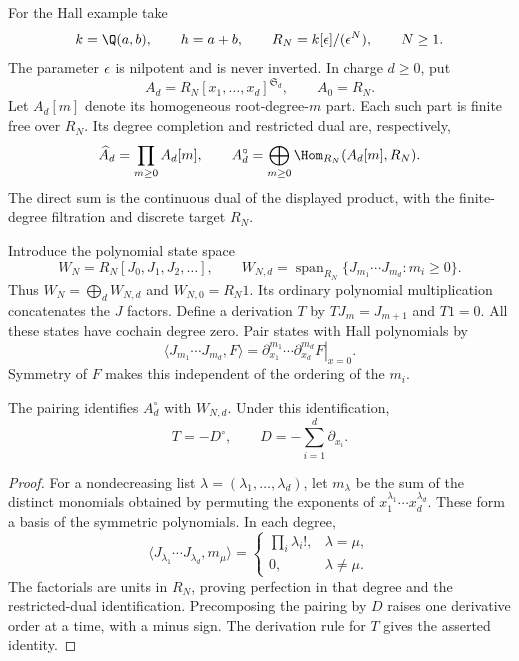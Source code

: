 For the Hall example take
\[
 k=\Q(a,b),\qquad h=a+b,\qquad
 R_N=k[\eps]/(\eps^N),\qquad N\geq1.
\]
The parameter $\epsilon$ is nilpotent and is never inverted. In charge
$d\geq0$, put
\[
 A_d=R_N[x_1,\ldots,x_d]^{\mathfrak S_d},\qquad A_0=R_N.
\]
Let $A_d[m]$ denote its homogeneous root-degree-$m$ part. Each such
part is finite free over $R_N$. Its degree completion and restricted
dual are, respectively,
\begin{equation}\label{cyjets:eq:restricted-dual}
 \widehat A_d=\prod_{m\geq0}A_d[m],\qquad
 A_d^\circ=\bigoplus_{m\geq0}
                 \Hom_{R_N}(A_d[m],R_N).
\end{equation}
The direct sum is the continuous dual of the displayed product,
with the finite-degree filtration and discrete target $R_N$.

Introduce the polynomial state space
\[
 W_N=R_N[J_0,J_1,J_2,\ldots],\qquad
 W_{N,d}=\operatorname{span}_{R_N}
       \{J_{m_1}\cdots J_{m_d}:m_i\geq0\}.
\]
Thus $W_N=\bigoplus_dW_{N,d}$ and $W_{N,0}=R_N1$.
Its ordinary polynomial multiplication concatenates the $J$ factors.
Define a derivation $T$ by $TJ_m=J_{m+1}$ and $T1=0$.
All these states have cochain degree zero. Pair states with Hall
polynomials by
\begin{equation}\label{cyjets:eq:pairing}
 \langle J_{m_1}\cdots J_{m_d},F\rangle
 =\left.\partial_{x_1}^{m_1}\cdots\partial_{x_d}^{m_d}F
                                                    \right|_{x=0}.
\end{equation}
Symmetry of $F$ makes this independent of the ordering of the $m_i$.

\begin{proposition}\label{cyjets:prop:pairing}
The pairing identifies $A_d^\circ$ with $W_{N,d}$. Under this
identification,
\[
 T=-D^\circ,\qquad D=-\sum_{i=1}^d\partial_{x_i}.
\]
\end{proposition}
\begin{proof}
For a nondecreasing list $\lambda=(\lambda_1,\ldots,\lambda_d)$,
let $m_\lambda$ be the sum of the distinct monomials obtained by
permuting the exponents of $x_1^{\lambda_1}\cdots x_d^{\lambda_d}$.
These form a basis of the symmetric polynomials. In each degree,
\[
 \langle J_{\lambda_1}\cdots J_{\lambda_d},m_\mu\rangle
 =\begin{cases}\prod_i\lambda_i!,&\lambda=\mu,\\0,&\lambda\ne\mu.
   \end{cases}
\]
The factorials are units in $R_N$, proving perfection in that degree
and the restricted-dual identification. Precomposing the pairing by
$D$ raises one derivative order at a time, with a minus sign.
The derivation rule for $T$ gives the asserted identity.
\end{proof}

